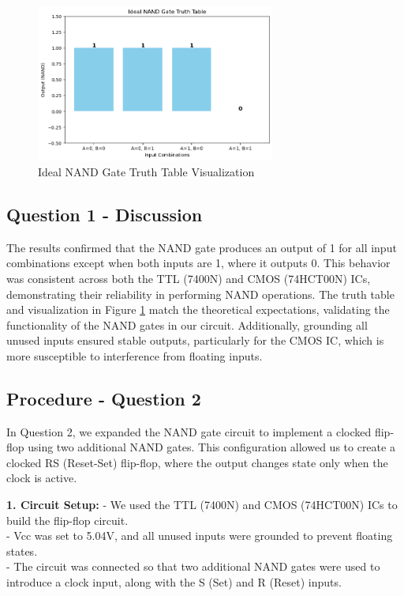 \documentclass{article}
\begin{document}
    \begin{figure}[H]
        \centering
        \includegraphics[width=0.7\textwidth]{./img/Lab 10/10_1_1.png}
        \caption{Ideal NAND Gate Truth Table Visualization}
        \label{fig:nand_truth_table}
    \end{figure}

    \subsection*{\textbf{Question 1 - Discussion}}
    The results confirmed that the NAND gate produces an output of 1 for all input combinations except when both inputs are 1, where it outputs 0. This behavior was consistent across both the TTL (7400N) and CMOS (74HCT00N) ICs, demonstrating their reliability in performing NAND operations. The truth table and visualization in Figure \ref{fig:nand_truth_table} match the theoretical expectations, validating the functionality of the NAND gates in our circuit. Additionally, grounding all unused inputs ensured stable outputs, particularly for the CMOS IC, which is more susceptible to interference from floating inputs. 
    \subsection*{\textbf{Procedure - Question 2}}
    In Question 2, we expanded the NAND gate circuit to implement a clocked flip-flop using two additional NAND gates. This configuration allowed us to create a clocked RS (Reset-Set) flip-flop, where the output changes state only when the clock is active.

    \textbf{1. Circuit Setup:}
   - We used the TTL (7400N) and CMOS (74HCT00N) ICs to build the flip-flop circuit.
   \\
   - Vcc was set to 5.04V, and all unused inputs were grounded to prevent floating states.
   \\
   - The circuit was connected so that two additional NAND gates were used to introduce a clock input, along with the S (Set) and R (Reset) inputs.
    \\
\end{document}

